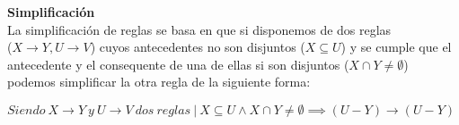 

\textbf{Simplificaci\'on}\\
La simplificaci\'on de reglas se basa en que si disponemos de dos reglas \\ (\(X \to Y , U \to V\)) cuyos antecedentes no son disjuntos (\(X \subseteq U\)) y se cumple que el antecedente y el consequente de una de ellas si son disjuntos (\(X \cap Y \neq \emptyset\)) podemos simplificar la otra regla de la siguiente forma:

\begin{center}
    \(Siendo \ X \to Y \ y \ U\to V \ dos \ reglas \ | \ X \subseteq U \wedge X \cap Y \neq \emptyset \implies (U - Y) \to (U - Y)\)
\end{center}



